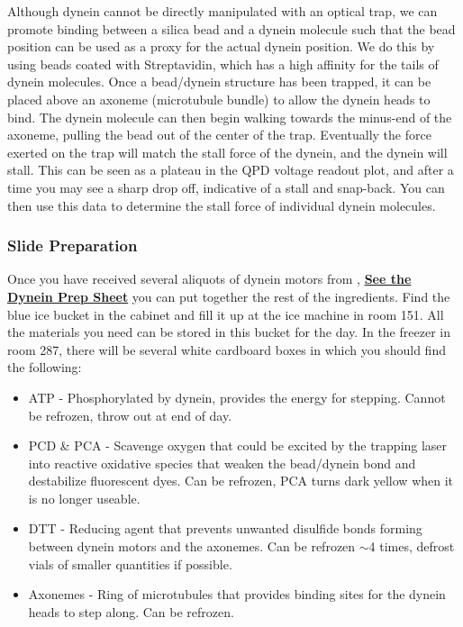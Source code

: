 \documentclass{../lab}
\begin{document}
Although dynein cannot be directly manipulated with an optical trap, we can promote binding between a silica bead and a dynein molecule such that the bead position can be used as a proxy for the actual dynein position. We do this by using beads coated with Streptavidin, which has a high affinity for the tails of dynein molecules. Once a bead/dynein structure has been trapped, it can be placed above an axoneme (microtubule bundle) to allow the dynein heads to bind. The dynein molecule can then begin walking towards the minus-end of the axoneme, pulling the bead out of the center of the trap. Eventually the force exerted on the trap will match the stall force of the dynein, and the dynein will stall. This can be seen as a plateau in the QPD voltage readout plot, and after a time you may see a sharp drop off, indicative of a stall and snap-back. You can then use this data to determine the stall force of individual dynein molecules.

\subsubsection{Slide Preparation}

Once you have received several aliquots of dynein motors from \LabEngineer, \href{http://experimentationlab.berkeley.edu/sites/default/files/images/Dynein\_OTZ\_Slide\_Prep-Yildiz\_Lab.pdf}{\textbf{See the Dynein Prep Sheet}} you can put together the rest of the ingredients. Find the blue ice bucket in the cabinet and fill it up at the ice machine in room 151. All the materials you need can be stored in this bucket for the day. In the freezer in room 287, there will be several white cardboard boxes in which you should find the following:

\begin{itemize}
    \item ATP - Phosphorylated by dynein, provides the energy for stepping. Cannot be refrozen, throw out at end of day.

    \item PCD \& PCA - Scavenge oxygen that could be excited by the trapping laser into reactive oxidative species that weaken the bead/dynein bond and destabilize fluorescent dyes. Can be refrozen, PCA turns dark yellow when it is no longer useable.

    \item DTT - Reducing agent that prevents unwanted disulfide bonds forming between dynein motors and the axonemes. Can be refrozen $\sim$4 times, defrost vials of smaller quantities if possible.

    \item Axonemes - Ring of microtubules that provides binding sites for the dynein heads to step along. Can be refrozen.

\end{itemize}
\end{document}
